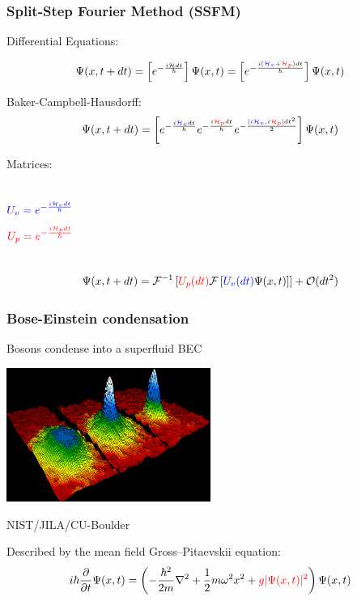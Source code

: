 \documentclass{beamer}
\begin{document}
\begin{frame}
\frametitle{Split-Step Fourier Method (SSFM)}

Differential Equations:

\begin{equation*}
\Psi(x,t + dt) = \left[e^{-\frac{i\mathcal{{H}}dt}{\hbar}}\right]\Psi(x,t) = \left[e^{-\frac{i({\color{blue}{\mathcal{{H}}_v}} + {\color{red}{\mathcal{{H}}_p}})dt}{\hbar}}\right]\Psi(x,t)
\end{equation*}

\pause
Baker-Campbell-Hausdorff:
\begin{equation*}
\Psi(x,t+dt) = \left[e^{-\frac{i{\color{blue}{\mathcal{{H}}_v}}dt}{\hbar}}e^{-\frac{i{\color{red}{\mathcal{{H}}_p}}dt}{\hbar}}e^{-\frac{[i{\color{blue}{\mathcal{{H}}_v}}, i{\color{red}{\mathcal{{H}}_p}}]dt^2}{2}}\right]\Psi(x,t)
\end{equation*}

\pause

Matrices:
\begin{columns}
$$
\color{blue}{{U}_v = e^{-\frac{i\mathcal{{H}}_vdt}{\hbar}}}
$$
$$
\color{red}{{U}_p = e^{-\frac{i\mathcal{{H}}_pdt}{\hbar}}}
$$
\end{columns}

\begin{equation*}
\Psi(x, t+dt) = \mathcal{F}^{-1}\left[{\color{red}{{U}_p(dt)}} \mathcal{F} \left[{\color{blue}{{U}_v(dt)}} \Psi(x,t) \right] \right] + \mathcal{O}(dt^2)
\end{equation*}

\end{frame}

\begin{frame}
\frametitle{Bose-Einstein condensation}
Bosons condense into a superfluid BEC

\begin{center}
\includegraphics[width=0.5\textwidth]{Bose_Einstein_condensate.png}

\tiny{NIST/JILA/CU-Boulder}
\end{center}

\pause

Described by the mean field Gross--Pitaevskii equation:
\begin{equation*}
    i\hbar \frac{\partial}{\partial t}\Psi(x,t) = \left( - \frac{\hbar^2}{2m} \nabla^2 + \frac{1}{2}m\omega^2x^2 + {\color{red}{g |\Psi(x,t)|^2}}\right)\Psi(x,t)
\end{equation*}


\end{frame}
\end{document}
